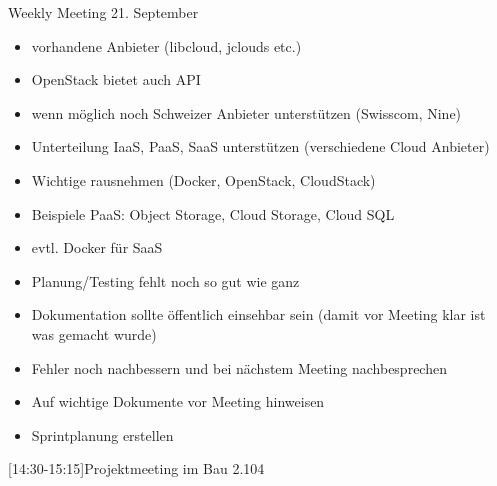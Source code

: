 
\begin{Protokoll}{Weekly Meeting 21. September}
\protokollKopf

\begin{itemize}
  \item vorhandene Anbieter (libcloud, jclouds etc.)
  \item OpenStack bietet auch API
  \item wenn möglich noch Schweizer Anbieter unterstützen (Swisscom, Nine)
\end{itemize}
\begin{itemize}
  \item Unterteilung IaaS, PaaS, SaaS unterstützen (verschiedene Cloud Anbieter)
  \item Wichtige rausnehmen (Docker, OpenStack, CloudStack)
  \item Beispiele PaaS: Object Storage, Cloud Storage, Cloud SQL
  \item evtl. Docker für SaaS
\end{itemize}
\begin{itemize}
  \item Planung/Testing fehlt noch so gut wie ganz
  \item Dokumentation sollte öffentlich einsehbar sein (damit vor Meeting klar ist was gemacht wurde)
  \item Fehler noch nachbessern und bei nächstem Meeting nachbesprechen
  \item Auf wichtige Dokumente vor Meeting hinweisen
  \item Sprintplanung erstellen
\end{itemize}

[14:30-15:15]{Projektmeeting im Bau 2.104}

\end{Protokoll}

